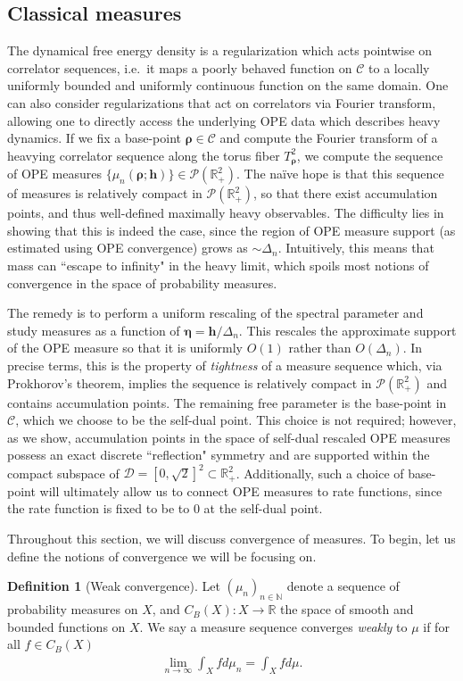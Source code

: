 \documentclass[a4paper,11pt]{article}
\theoremstyle{plain}
\theoremstyle{definition}
\newtheorem{defn}{Definition}[section]
\theoremstyle{remark}
\newcommand{\bs}[1]{\boldsymbol{#1}}
\newcommand{\ba}{\begin{equation} \begin{aligned}}
\newcommand{\ea}{\end{aligned} \end{equation}}
\newcommand{\De}{\Delta}
\begin{document}
\subsection{Classical measures}
\label{classicalmeasures}

The dynamical free energy density is a regularization which acts pointwise on correlator sequences, i.e.~it maps a poorly behaved function on $\mathscr{C}$ to a locally uniformly bounded and uniformly continuous function on the same domain. One can also consider regularizations that act on correlators via Fourier transform, allowing one to directly access the underlying OPE data which describes heavy dynamics. If we fix a base-point $\bs{\rho} \in\mathscr{C}$ and compute the Fourier transform of a heavying correlator sequence along the torus fiber $T^2_{\bs{\rho}}$, we compute the sequence of OPE measures $\{\mu_n(\bs{\rho};\bs{h})\} \in \mathcal{P}(\mathbb{R}^2_+)$. The na\"ive hope is that this sequence of measures is relatively compact in $\mathcal{P}(\mathbb{R}^2_+)$, so that there exist accumulation points, and thus well-defined maximally heavy observables. The difficulty lies in showing that this is indeed the case, since the region of OPE measure support (as estimated using OPE convergence) grows as $\sim \De_n$. Intuitively, this means that mass can ``escape to infinity" in the heavy limit, which spoils most notions of convergence in the space of probability measures. 

The remedy is to perform a uniform rescaling of the spectral parameter and study measures as a function of $\bs{\eta} = \bs{h}/\De_n$. This rescales the approximate support of the OPE measure so that it is uniformly $O(1)$ rather than $O(\De_n)$. In precise terms, this is the property of \textit{tightness} of a measure sequence which, via Prokhorov's theorem, implies the sequence is relatively compact in $\mathcal{P}(\mathbb{R}^2_+)$ and contains accumulation points. The remaining free parameter is the base-point in $\mathscr{C}$, which we choose to be the self-dual point. This choice is not required; however, as we show, accumulation points in the space of self-dual rescaled OPE measures possess an exact discrete ``reflection" symmetry and are supported within the compact subspace of $\mathcal{D} = [0,\sqrt{2}]^2 \subset\mathbb{R}^2_+$. Additionally, such a choice of base-point will ultimately allow us to connect OPE measures to rate functions, since the rate function is fixed to be to $0$ at the self-dual point. 

Throughout this section, we will discuss convergence of measures. To begin, let us define the notions of convergence we will be focusing on. 
\begin{defn}[Weak convergence]
Let $(\mu_n)_{n\in\mathbb{N}}$ denote a sequence of probability measures on $X$, and $ C_B(X): X \to \mathbb{R}$ the space of smooth and bounded functions on $X$. We say a measure sequence converges \textit{weakly} to $\mu$ if for all $f \in C_B(X)$
\ba
\lim_{n \to \infty} \int_X f d\mu_n = \int_X f d\mu.
\ea
\end{defn}
\end{document}
